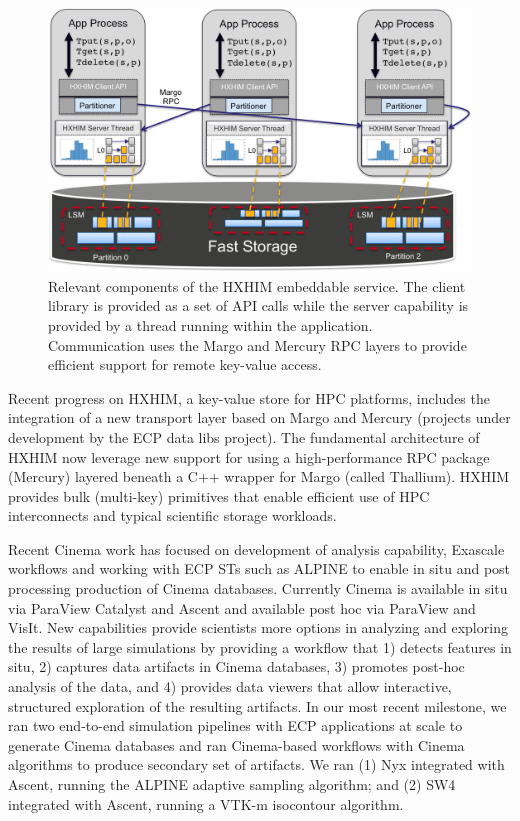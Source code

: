 \begin{figure}[htb]
	\centering
	\includegraphics[width=6in]{projects/2.3.6-NNSA/2.3.6.01-LANL-ATDM/hxhim-main}
	\caption{\label{fig:hxhim} Relevant components of the HXHIM
	embeddable service. The client library is provided as a set of API
	calls while the server capability is provided by a thread running
	within the application. Communication uses the Margo and Mercury RPC
	layers to provide efficient support for remote key-value access.}
\end{figure}

Recent progress on HXHIM, a key-value store for HPC platforms, includes the
integration of a new transport layer based on Margo and Mercury (projects
under development by the ECP data libs project). The fundamental architecture
of HXHIM now leverage new support for using a high-performance RPC package
(Mercury) layered beneath a C++ wrapper for Margo (called Thallium). HXHIM
provides bulk (multi-key) primitives that enable efficient use of HPC
interconnects and typical scientific storage workloads.



Recent Cinema work has focused on development of analysis capability, Exascale workflows and working with ECP STs such as ALPINE to enable in situ and post processing production of Cinema databases.  Currently Cinema is available in situ via ParaView Catalyst and Ascent and available post hoc via ParaView and VisIt.   New capabilities provide scientists more options in analyzing and exploring the results of large simulations by providing a workflow that 1) detects features in situ, 2) captures data artifacts in Cinema databases, 3) promotes post-hoc analysis of the data, and 4) provides data viewers that allow interactive, structured exploration of the resulting artifacts. 
%
In our most recent milestone, we ran two end-to-end simulation pipelines with ECP applications at scale to generate Cinema databases and ran Cinema-based workflows with Cinema algorithms to produce secondary set of artifacts.  We ran (1) Nyx integrated with Ascent, running the ALPINE adaptive sampling algorithm; and (2) SW4 integrated with Ascent, running a VTK-m isocontour algorithm.  

